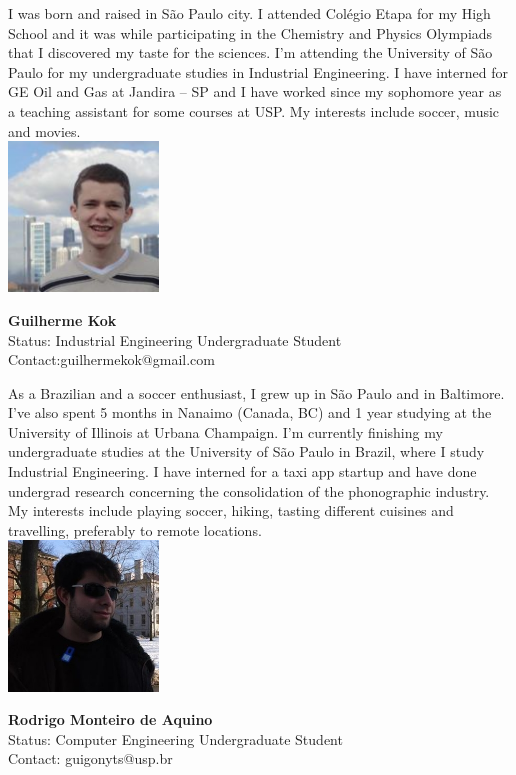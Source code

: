 I was born and raised in S\~{a}o Paulo city. I attended Colégio Etapa for my High School and it was while participating in the Chemistry and Physics Olympiads that I discovered my taste for the sciences. I'm attending the University of S\~{a}o Paulo for my undergraduate studies in Industrial Engineering. I have interned for GE Oil and Gas at Jandira – SP and I have worked since my sophomore year as a teaching assistant for some courses at USP. My interests include soccer, music and movies.
\\ 

\noindent \includegraphics[width=40mm]{images/image016}
\parbox[b]{0.6\textwidth}{\textbf{Guilherme Kok}\\
Status: Industrial Engineering Undergraduate Student \\
Contact:guilhermekok@gmail.com  \\
}

As a Brazilian and a soccer enthusiast, I grew up in S\~{a}o Paulo and in Baltimore. I've also spent 5 months in Nanaimo (Canada, BC) and 1 year studying at the University of Illinois at Urbana Champaign. I'm currently finishing my undergraduate studies at the University of S\~{a}o Paulo in Brazil, where I study Industrial Engineering. I have interned for a taxi app startup and have done undergrad research concerning the consolidation of the phonographic industry. My interests include playing soccer, hiking, tasting different cuisines and travelling, preferably to remote locations. 
\\

\noindent \includegraphics[width=40mm]{images/image014}
\parbox[b]{0.6\textwidth}{\textbf{Rodrigo Monteiro de Aquino}\\
Status: Computer Engineering Undergraduate Student \\
Contact: guigonyts@usp.br \\
}

